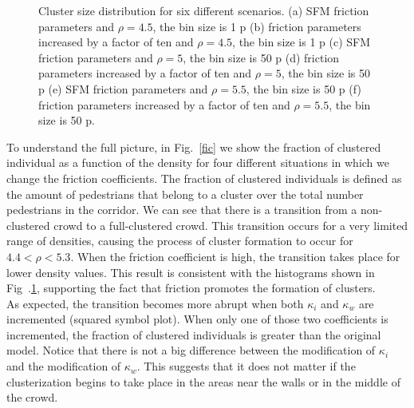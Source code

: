 \begin{figure}[!htbp]
\caption[width=0.47\columnwidth]{Cluster size distribution for six different scenarios. (a) SFM friction parameters and $\rho=4.5$, the bin size is 1 p (b) friction parameters increased by a factor of ten and $\rho=4.5$, the bin size is 1 p (c) SFM friction parameters and $\rho=5$, the bin size is 50 p (d) friction parameters increased by a factor of ten and $\rho=5$, the bin size is 50 p (e) SFM friction parameters and $\rho=5.5$, the bin size is 50 p (f) friction parameters increased by a factor of ten and $\rho=5.5$, the bin size is 50 p.}
\label{cluster_distribution}
\end{figure}

To understand the full picture, in Fig.~\ref{fic} we show the fraction of clustered individual as a function of the density for four different situations in which we change the friction coefficients. The fraction of clustered individuals is defined as the amount of pedestrians that belong to a cluster over the total number pedestrians in the corridor. 
We can see that there is a transition from a non-clustered crowd to a full-clustered crowd. This transition occurs for a very limited range of densities, causing the process of cluster formation to occur for $4.4<\rho<5.3$. When the friction coefficient is high, the transition takes place for lower density values. This result is consistent with the histograms shown in Fig~.\ref{cluster_distribution}, supporting the fact that friction promotes the formation of clusters. \\

As expected, the transition becomes more abrupt when both $\kappa_i$ and $\kappa_w$ are incremented (squared symbol plot). When only one of those two coefficients is incremented, the fraction of clustered individuals is greater than the original model. Notice that there is not a big difference between the modification of $\kappa_i$ and the modification of $\kappa_w$. This suggests that it does not matter if the clusterization begins to take place in the areas near the walls or in the middle of the crowd.\\


